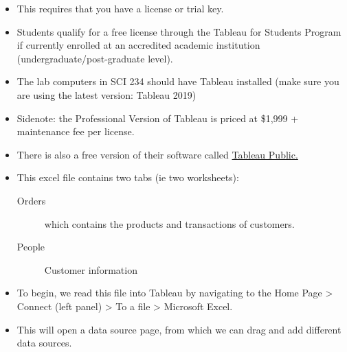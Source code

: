 \documentclass[xcolor=svgnames]{beamer} %
\begin{document}
\begin{frame}
\begin{itemize}
\item This requires that you have a license or trial key. \vfill
\item Students qualify for a free license through the Tableau for Students Program if currently enrolled at an accredited academic institution (undergraduate/post-graduate level).\vfill
\item The lab computers in SCI 234 should have Tableau installed (make sure you are using the latest version: Tableau 2019) \vfill
\item Sidenote: the Professional Version of Tableau is priced at \$1,999 + maintenance fee per license. 
\vfill
\item There is also a free version of their software called \href{https://public.tableau.com/en-us/s/}{Tableau Public.}

\end{itemize}
\end{frame}


%


%


\begin{frame}
\begin{itemize}
\item This excel file contains two tabs (ie two worksheets):
\begin{description}
\item[Orders]  which contains the products and transactions of customers.
\item[People] Customer information
\end{description}
\vfill

\item To begin, we read this file into Tableau by navigating to the Home Page > Connect (left panel) > To a file > Microsoft Excel.\vfill
\item This will open a data source page, from which we can drag and add different data sources.\vfill
\end{itemize}
\end{frame}
\end{document}
